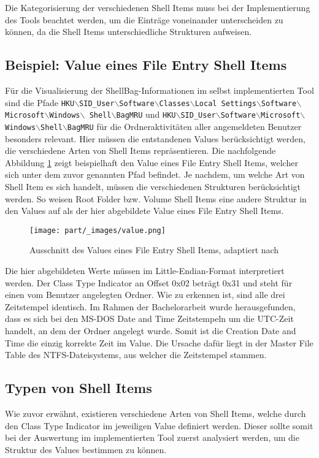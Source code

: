 Die Kategorisierung der verschiedenen Shell Items muss bei der Implementierung des Tools beachtet werden, um die Einträge voneinander unterscheiden zu können, da die Shell Items unterschiedliche Strukturen aufweisen.

\subsection{Beispiel: Value eines File Entry Shell Items}
Für die Visualisierung der ShellBag-Informationen im selbst implementierten  Tool sind die Pfade \texttt{HKU$\backslash$SID\_User$\backslash$Software$\backslash$Classes$\backslash$Local Settings$\backslash$Software$\backslash$Microsoft$\backslash$Windows$\backslash$ \newline Shell$\backslash$BagMRU} und \texttt{HKU$\backslash$SID\_User$\backslash$Software$\backslash$Microsoft$\backslash$Windows$\backslash$Shell$\backslash$BagMRU} für die Ordneraktivitäten aller angemeldeten Benutzer besonders relevant. Hier müssen die entstandenen Values berücksichtigt werden, die verschiedene Arten von Shell Items repräsentieren. \newline
Die nachfolgende Abbildung \ref{img:value} zeigt beispielhaft den Value eines File Entry Shell Items, welcher sich unter dem zuvor genannten Pfad befindet. Je nachdem, um welche Art von Shell Item es sich handelt, müssen die verschiedenen Strukturen berücksichtigt werden. So weisen Root Folder bzw. Volume Shell Items eine andere Struktur in den Values auf als der hier abgebildete Value eines File Entry Shell Items.

\begin{figure}[H]
	\centering
	\texttt{[image: part/\_images/value.png]}
	\caption{Ausschnitt des Values eines File Entry Shell Items, adaptiert nach \cite{lo2014windows}} 
	\label{img:value}
\end{figure}
Die hier abgebildeten Werte müssen im Little-Endian-Format interpretiert werden. Der Class Type Indicator an Offset 0x02 beträgt 0x31 und steht für einen vom Benutzer angelegten Ordner. Wie zu erkennen ist, sind alle drei Zeitstempel identisch. Im Rahmen der Bachelorarbeit wurde herausgefunden, dass es sich bei den MS-DOS Date and Time Zeitstempeln um die UTC-Zeit handelt, an dem der Ordner angelegt wurde. Somit ist die Creation Date and Time die einzig korrekte Zeit im Value. Die Ursache dafür liegt in der Master File Table des NTFS-Dateisystems, aus welcher die Zeitstempel stammen. \cite{ba} 

\subsection{Typen von Shell Items}
Wie zuvor erwähnt, existieren verschiedene Arten von Shell Items, welche durch den Class Type Indicator im jeweiligen Value definiert werden. Dieser sollte somit bei der Auswertung im implementierten Tool zuerst analysiert werden, um die Struktur des Values bestimmen zu können. 


